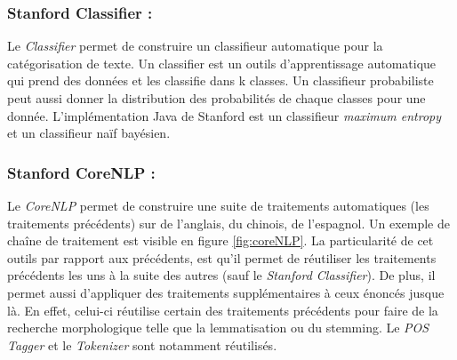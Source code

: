             \subsubsection{Stanford Classifier :}
                Le \textit{Classifier} permet de construire un classifieur automatique pour la catégorisation de texte. Un classifier est un outils d'apprentissage automatique qui prend des données et les classifie dans k classes. Un classifieur probabiliste peut aussi donner la distribution des probabilités de chaque classes pour une donnée. L’implémentation Java de Stanford est un classifieur \textit{maximum entropy} et un classifieur naïf bayésien.

            \subsubsection{Stanford CoreNLP :}
                Le \textit{CoreNLP} permet de construire une suite de traitements automatiques (les traitements précédents) sur de l'anglais, du chinois, de l'espagnol. Un exemple de chaîne de traitement est visible en figure \ref{fig:coreNLP}. La particularité de cet outils par rapport aux précédents, est qu'il permet de réutiliser les traitements précédents les uns à la suite des autres (sauf le \textit{Stanford Classifier}). De plus, il permet aussi d'appliquer des traitements supplémentaires à ceux énoncés jusque là. En effet, celui-ci réutilise certain des traitements précédents pour faire de la recherche morphologique telle que la lemmatisation ou du stemming. Le \textit{POS Tagger} et le \textit{Tokenizer} sont notamment réutilisés.


